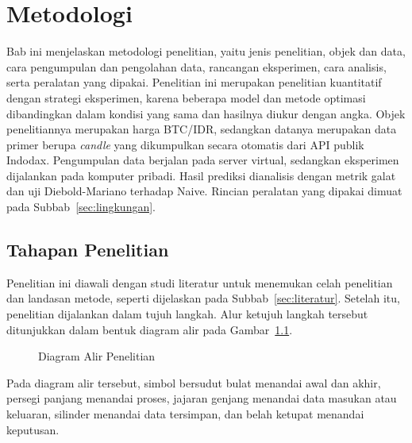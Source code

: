 \chapter{Metodologi}

\usetikzlibrary{patterns,decorations.pathreplacing}

Bab ini menjelaskan metodologi penelitian, yaitu jenis penelitian, objek dan
data, cara pengumpulan dan pengolahan data, rancangan eksperimen, cara
analisis, serta peralatan yang dipakai. Penelitian ini merupakan penelitian
kuantitatif dengan strategi eksperimen, karena beberapa model dan metode
optimasi dibandingkan dalam kondisi yang sama dan hasilnya diukur dengan
angka. Objek penelitiannya merupakan harga BTC/IDR, sedangkan datanya
merupakan data primer berupa \textit{candle} yang dikumpulkan secara otomatis
dari API publik Indodax. Pengumpulan data berjalan pada server virtual,
sedangkan eksperimen dijalankan pada komputer pribadi. Hasil prediksi dianalisis
dengan metrik galat dan uji Diebold-Mariano terhadap Naive. Rincian peralatan
yang dipakai dimuat pada Subbab~\ref{sec:lingkungan}.

\section{Tahapan Penelitian}
Penelitian ini diawali dengan studi literatur untuk menemukan celah penelitian
dan landasan metode, seperti dijelaskan pada Subbab~\ref{sec:literatur}.
Setelah itu, penelitian dijalankan dalam tujuh langkah. Alur ketujuh langkah tersebut ditunjukkan dalam bentuk diagram alir pada Gambar~\ref{fig:alur}.

\begin{figure}[!htbp]
  \centering
  \caption{Diagram Alir Penelitian}
  \label{fig:alur}
\end{figure}

Pada diagram alir tersebut,
simbol bersudut bulat menandai awal dan akhir, persegi panjang menandai
proses, jajaran genjang menandai data masukan atau keluaran, silinder menandai
data tersimpan, dan belah ketupat menandai keputusan.


